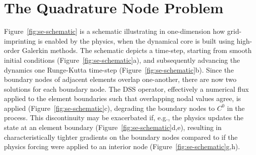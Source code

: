 \documentclass[twocol]{ametsoc}
\begin{document}
\section{{\color{red}The Quadrature Node Problem{}}}\label{sec:nodeproblem}

{\color{red}Figure~\ref{fig:se-schematic} is a schematic illustrating in one-dimension how grid-imprinting is enabled by the physics, when the dynamical core is built using high-order Galerkin methods. The schematic depicts a time-step, starting from smooth initial conditions (Figure~\ref{fig:se-schematic}a), and subsequently advancing the dynamics one Runge-Kutta time-step (Figure~\ref{fig:se-schematic}b). Since the boundary nodes of adjacent elements overlap one-another, there are now two solutions for each boundary node. The DSS operator, effectively a numerical flux applied to the element boundaries such that overlapping nodal values agree, is applied (Figure~\ref{fig:se-schematic}c),  degrading the boundary nodes to $C^0$ in the process. This discontinuity may be exacerbated if, e.g., the physics updates the state at an element boundary (Figure~\ref{fig:se-schematic}d,e), resulting in characteristically tighter gradients on the boundary nodes compared to if the physics forcing were applied to an interior node (Figure~\ref{fig:se-schematic}g,h).{}}   
\end{document}
